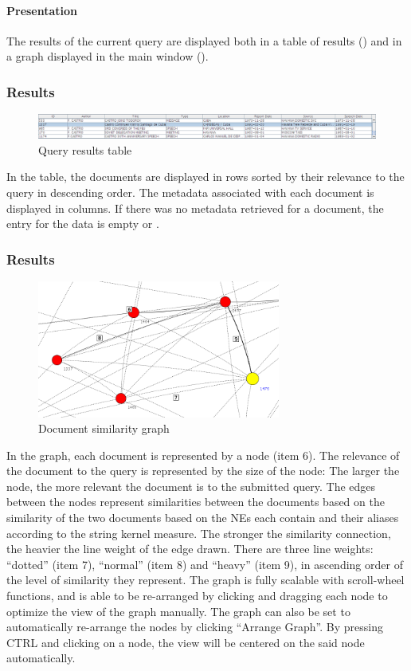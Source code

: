 \paragraph{Presentation}
The results of the current query are displayed both in a table of results () and in a graph displayed in the main window ().

\subsubsection{Results}
\begin{figure}[h]
\centering
\caption{Query results table}
\includegraphics[width=160mm]{table.png}
\end{figure}

In the table, the documents are displayed in rows sorted by their relevance to the query in descending order. The metadata associated with each document is displayed in columns. If there was no metadata retrieved for a document, the entry for the data is empty or .

\subsubsection{Results}
\begin{figure}[h]
\centering
\caption{Document similarity graph}
\includegraphics[width=80mm]{nodecloseup.png}
\end{figure}

In the graph, each document is represented by a node (item 6). The relevance of the document to the query is represented by the size of the node: The larger the node, the more relevant the document is to the submitted query. The edges between the nodes represent similarities between the documents based on the similarity of the two documents based on the NEs each contain and their aliases according to the string kernel measure. The stronger the similarity connection, the heavier the line weight of the edge drawn. There are three line weights: ``dotted'' (item 7), ``normal'' (item 8) and ``heavy'' (item 9), in ascending order of the level of similarity they represent. The graph is fully scalable with scroll-wheel functions, and is able to be re-arranged by clicking and dragging each node to optimize the view of the graph manually. The graph can also be set to automatically re-arrange the nodes by clicking ``Arrange Graph''. By pressing CTRL and clicking on a node, the view will be centered on the said node automatically.

